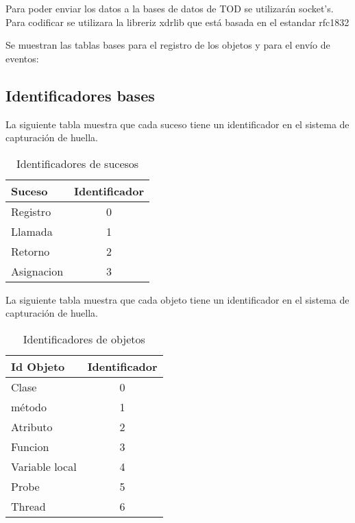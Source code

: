 \documentclass[10pt,a4paper]{article}
\begin{document}
Para poder enviar los datos a la bases de datos de TOD se utilizarán socket's.  Para codificar se utilizara la libreriz xdrlib que está basada en el estandar rfc1832 \cite{rfc1832}

Se muestran las tablas bases para el registro de los objetos y para el envío de eventos:

\subsection{Identificadores bases}

La siguiente tabla muestra que cada suceso tiene un identificador en el sistema de capturación de huella.
\begin{table}[h]
\begin{center}
\begin{tabular}{|l | c |}
\hline
Suceso & Identificador\\
\hline
Registro & 0\\
\hline
Llamada & 1\\
\hline
Retorno & 2\\
\hline
Asignacion & 3\\
\hline
\end{tabular}
\caption{Identificadores de sucesos} 
\end{center}
\end{table}

La siguiente tabla muestra que cada objeto tiene un identificador en el sistema de capturación de huella.
\begin{table}[h]
\begin{center}
\begin{tabular}{|l | c |}
\hline
Id Objeto & Identificador\\
\hline
Clase & 0\\
\hline
método & 1\\
\hline
Atributo & 2\\
\hline
Funcion & 3\\
\hline
Variable local & 4\\
\hline
Probe & 5\\
\hline
Thread & 6\\
\hline
\end{tabular}
\caption{Identificadores de objetos} 
\end{center}
\end{table}
\\
\pagebreak
\end{document}
